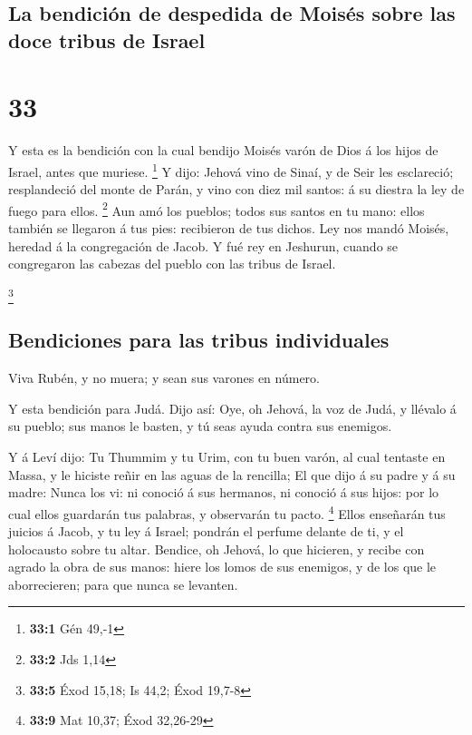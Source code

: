 \hypertarget{la-bendiciuxf3n-de-despedida-de-moisuxe9s-sobre-las-doce-tribus-de-israel}{%
\subsection{La bendición de despedida de Moisés sobre las doce tribus de
Israel}\label{la-bendiciuxf3n-de-despedida-de-moisuxe9s-sobre-las-doce-tribus-de-israel}}

\hypertarget{section-32}{%
\section{33}\label{section-32}}

 Y esta es la bendición con la cual bendijo Moisés varón de
Dios á los hijos de Israel, antes que muriese. \footnote{\textbf{33:1}
  Gén 49,-1}  Y dijo: Jehová vino de Sinaí, y de Seir les
esclareció; resplandeció del monte de Parán, y vino con diez mil santos:
á su diestra la ley de fuego para ellos. \footnote{\textbf{33:2} Jds
  1,14}  Aun amó los pueblos; todos sus santos en tu mano:
ellos también se llegaron á tus pies: recibieron de tus dichos.
 Ley nos mandó Moisés, heredad á la congregación de Jacob.
 Y fué rey en Jeshurun, cuando se congregaron las cabezas
del pueblo con las tribus de Israel.

\footnote{\textbf{33:5} Éxod 15,18; Is 44,2; Éxod 19,7-8}

\hypertarget{bendiciones-para-las-tribus-individuales}{%
\subsection{Bendiciones para las tribus
individuales}\label{bendiciones-para-las-tribus-individuales}}

 Viva Rubén, y no muera; y sean sus varones en número.

 Y esta bendición para Judá. Dijo así: Oye, oh Jehová, la
voz de Judá, y llévalo á su pueblo; sus manos le basten, y tú seas ayuda
contra sus enemigos.

 Y á Leví dijo: Tu Thummim y tu Urim, con tu buen varón, al
cual tentaste en Massa, y le hiciste reñir en las aguas de la rencilla;
 El que dijo á su padre y á su madre: Nunca los vi: ni
conoció á sus hermanos, ni conoció á sus hijos: por lo cual ellos
guardarán tus palabras, y observarán tu pacto. \footnote{\textbf{33:9}
  Mat 10,37; Éxod 32,26-29}  Ellos enseñarán tus juicios á
Jacob, y tu ley á Israel; pondrán el perfume delante de ti, y el
holocausto sobre tu altar.  Bendice, oh Jehová, lo que
hicieren, y recibe con agrado la obra de sus manos: hiere los lomos de
sus enemigos, y de los que le aborrecieren; para que nunca se levanten.

